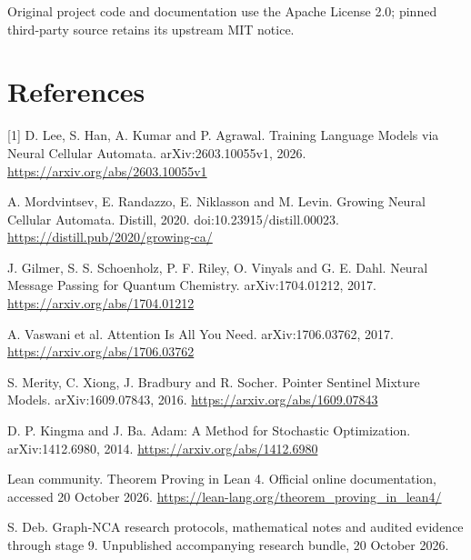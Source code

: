 \documentclass[11pt,a4paper]{article}
\begin{document}
Original project code and documentation use the Apache License 2.0; pinned third-party source retains its upstream MIT notice.

\section*{References}
[1] D. Lee, S. Han, A. Kumar and P. Agrawal. Training Language Models via Neural Cellular Automata. arXiv:2603.10055v1, 2026. \url{https://arxiv.org/abs/2603.10055v1}\par
[2] A. Mordvintsev, E. Randazzo, E. Niklasson and M. Levin. Growing Neural Cellular Automata. Distill, 2020. doi:10.23915/\allowbreak{}distill.00023. \url{https://distill.pub/2020/growing-ca/}\par
[3] J. Gilmer, S. S. Schoenholz, P. F. Riley, O. Vinyals and G. E. Dahl. Neural Message Passing for Quantum Chemistry. arXiv:1704.01212, 2017. \url{https://arxiv.org/abs/1704.01212}\par
[4] A. Vaswani et al. Attention Is All You Need. arXiv:1706.03762, 2017. \url{https://arxiv.org/abs/1706.03762}\par
[5] S. Merity, C. Xiong, J. Bradbury and R. Socher. Pointer Sentinel Mixture Models. arXiv:1609.07843, 2016. \url{https://arxiv.org/abs/1609.07843}\par
[6] D. P. Kingma and J. Ba. Adam: A Method for Stochastic Optimization. arXiv:1412.6980, 2014. \url{https://arxiv.org/abs/1412.6980}\par
[7] Lean community. Theorem Proving in Lean 4. Official online documentation, accessed 20 October 2026. \url{https://lean-lang.org/theorem_proving_in_lean4/}\par
[8] S. Deb. Graph-NCA research protocols, mathematical notes and audited evidence through stage 9. Unpublished accompanying research bundle, 20 October 2026.\par
\clearpage
\end{document}
